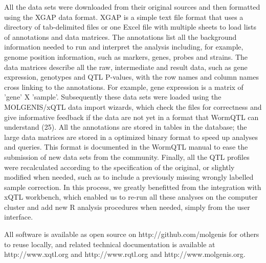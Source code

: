 All the data sets were downloaded from their original sources and then formatted using the 
XGAP data format. XGAP is a simple text file format that uses a directory of tab-delimited 
files or one Excel file with multiple sheets to load lists of annotations and data matrices. 
The annotations list all the background information needed to run and interpret the analysis 
including, for example, genome position information, such as markers, genes, probes and 
strains. The data matrices describe all the raw, intermediate and result data, such as gene 
expression, genotypes and QTL P-values, with the row names and column names cross linking to 
the annotations. For example, gene expression is a matrix of 'gene' X 'sample'. Subsequently 
these data sets were loaded using the MOLGENIS/xQTL data import wizards, which check the 
files for correctness and give informative feedback if the data are not yet in a format that 
WormQTL can understand (25). All the annotations are stored in tables in the database; the 
large data matrices are stored in a optimized binary format to speed up analyses and queries. 
This format is documented in the WormQTL manual to ease the submission of new data sets from 
the community. Finally, all the QTL profiles were recalculated according to the specification 
of the original, or slightly modified when needed, such as to include a previously missing 
wrongly labelled sample correction. In this process, we greatly benefitted from the integration 
with xQTL workbench, which enabled us to re-run all these analyses on the computer cluster 
and add new R analysis procedures when needed, simply from the user interface.

All software is available as open source on http://github.com/molgenis for others to reuse 
locally, and related technical documentation is available at http://www.xqtl.org and 
http://www.rqtl.org and http://www.molgenis.org.


